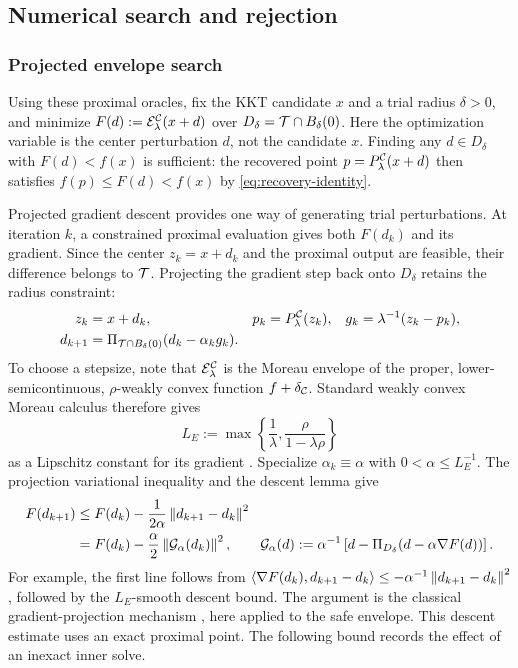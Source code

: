 \subsection{Numerical search and rejection}

\subsubsection{Projected envelope search}

Using these proximal oracles, fix the KKT candidate \(x\) and
a trial radius \(\delta>0\), and minimize
\(F(d):=\mathcal{E}_\lambda^{\mathcal{C}}(x+d)\) over
\(D_\delta=\mathcal{T}\cap B_\delta(0)\).  Here the optimization variable is the
center perturbation \(d\), not the candidate \(x\).  Finding any
\(d\in D_\delta\) with \(F(d)<f(x)\) is sufficient: the recovered point
\(p=P_\lambda^{\mathcal{C}}(x+d)\) then satisfies
\(f(p)\le F(d)<f(x)\) by \cref{eq:recovery-identity}.

Projected gradient descent provides one way of generating trial
perturbations.  At iteration \(k\), a constrained proximal evaluation gives
both \(F(d_k)\) and its gradient.  Since the center \(z_k=x+d_k\) and the
proximal output are feasible, their difference belongs to \(\mathcal{T}\).
Projecting the gradient step back onto \(D_\delta\) retains the radius
constraint:
\begin{align}
  z_k&=x+d_k, &
  p_k&=P_\lambda^{\mathcal{C}}(z_k), &
  g_k&=\lambda^{-1}(z_k-p_k),\nonumber\\
  d_{k+1}
  &=
  \Pi_{\mathcal{T}\cap B_\delta(0)}
       (d_k-\alpha_k g_k).
  \label{eq:outer-pg}
\end{align}
To choose a stepsize, note that
\(\mathcal{E}_\lambda^{\mathcal{C}}\) is the Moreau envelope of the proper,
lower-semicontinuous, \(\rho\)-weakly convex function
\(f+\delta_{\mathcal{C}}\).  Standard weakly convex Moreau calculus therefore gives
\begin{equation}
  L_E
  :=
  \max\left\{
    \frac{1}{\lambda},
    \frac{\rho}{1-\lambda\rho}
  \right\}
  \label{eq:envelope-lipschitz-bound}
\end{equation}
\noindent as a Lipschitz constant for its gradient
\citep[Lemma~2.5]{DavisDrusvyatskiy2022}.
Specialize \(\alpha_k\equiv\alpha\) with \(0<\alpha\le L_E^{-1}\).  The projection
variational inequality and the descent lemma give
\begin{align}
  F(d_{k+1})
  &\le
  F(d_k)-\frac{1}{2\alpha}\left\lVert d_{k+1}-d_k\right\rVert^{2}\nonumber\\
  &=
  F(d_k)-\frac{\alpha}{2}
  \left\lVert \mathcal{G}_{\alpha}(d_k)\right\rVert^{2},
  \qquad
  \mathcal{G}_{\alpha}(d)
  :=
  \alpha^{-1}
  \left[
    d-\Pi_{D_\delta}(d-\alpha\nabla F(d))
  \right].
  \label{eq:outer-pg-descent}
\end{align}
For example, the first line follows from
\(\left\langle \nabla F(d_k),d_{k+1}-d_k\right\rangle
\le-\alpha^{-1}\left\lVert d_{k+1}-d_k\right\rVert^{2}\), followed by the
\(L_E\)-smooth descent bound.  The argument is the classical
gradient-projection mechanism \cite{Rosen1960}, here applied to the safe
envelope.  This descent estimate uses an exact proximal point.  The following
bound records the effect of an inexact inner solve.


